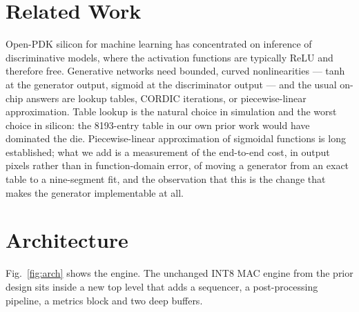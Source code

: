 \documentclass[conference,a4paper]{APSIPA2026}
\begin{document}
\section{Related Work}
Open-PDK silicon for machine learning has concentrated on inference of discriminative models, where the activation functions are typically ReLU and therefore free. Generative networks need bounded, curved nonlinearities --- tanh at the generator output, sigmoid at the discriminator output --- and the usual on-chip answers are lookup tables, CORDIC iterations, or piecewise-linear approximation. Table lookup is the natural choice in simulation and the worst choice in silicon: the 8193-entry table in our own prior work would have dominated the die. Piecewise-linear approximation of sigmoidal functions is long established; what we add is a measurement of the end-to-end cost, in output pixels rather than in function-domain error, of moving a generator from an exact table to a nine-segment fit, and the observation that this is the change that makes the generator implementable at all.

\section{Architecture}\label{sec:arch}
Fig.~\ref{fig:arch} shows the engine. The unchanged INT8 MAC engine from the prior design sits inside a new top level that adds a sequencer, a post-processing pipeline, a metrics block and two deep buffers.
\end{document}
